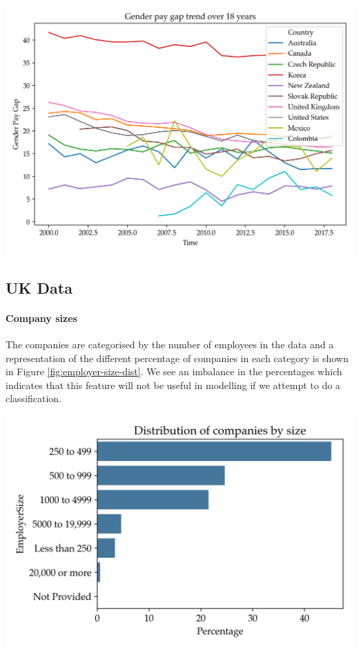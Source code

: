     \begin{centering}
        \includegraphics[width=0.99\linewidth]{images/Country_time.png}
        \label{fig:country-time-gap}
    \end{centering}

\subsection{UK Data}

\paragraph{Company sizes}
    The companies are categorised by the number of employees in the data and a representation of the different percentage of companies in each category is shown in Figure \ref{fig:employer-size-dist}. We see an imbalance in the percentages which indicates that this feature will not be useful in modelling if we attempt to do a classification.

    \begin{centering}
        \includegraphics[width=0.9\linewidth]{images/EmployerSize2018.png}
        \label{fig:employer-size-dist}
    \end{centering}

